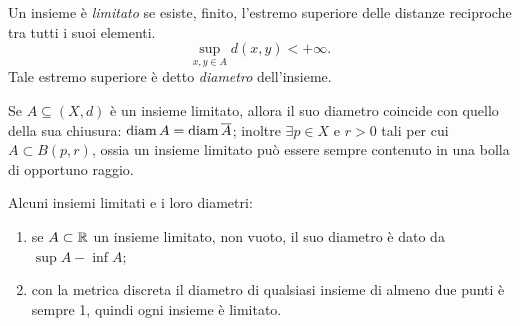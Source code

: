 \begin{definizione}
Un insieme è \emph{limitato} se esiste, finito, l'estremo superiore delle distanze reciproche tra tutti i suoi elementi.
\[
\sup_{x,y\in A} d(x,y)<+\infty.
\]
Tale estremo superiore è detto \emph{diametro} dell'insieme.
\end{definizione}
Se $A\subseteq (X,d)$ è un insieme limitato, allora il suo diametro coincide con quello della sua chiusura: $\operatorname{diam} A=\operatorname{diam}\overline{A}$; inoltre $\exists p\in X$ e $r>0$ tali per cui $A\subset B(p,r)$, ossia un insieme limitato può essere sempre contenuto in una bolla di opportuno raggio.
\begin{esempio} \label{es:insiemi-limitati}
	Alcuni insiemi limitati e i loro diametri:
	\begin{enumerate}
		\item se $A\subset\mathbb{R}$ un insieme limitato, non vuoto, il suo diametro è dato da $\sup A-\inf A$;
		\item con la metrica discreta il diametro di qualsiasi insieme di almeno due punti è sempre 1, quindi ogni insieme è limitato.
	\end{enumerate}
\end{esempio}
